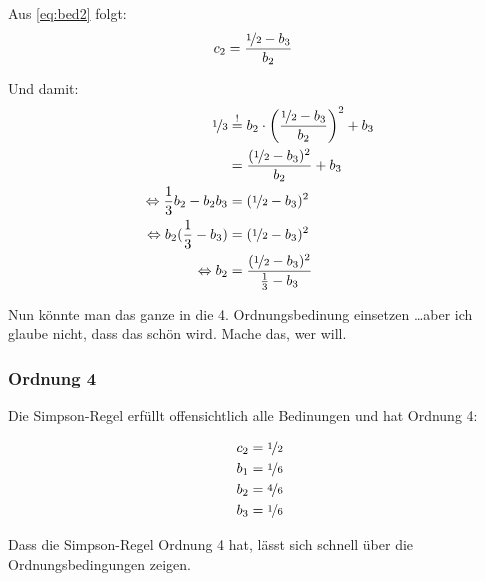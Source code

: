 Aus \ref{eq:bed2} folgt:
\begin{align}
    c_2 &= \frac{\nicefrac{1}{2} - b_3}{b_2}
\end{align}

Und damit:
\begin{align}
    \nicefrac{1}{3} &\stackrel{!}{=} b_2 \cdot \left (\frac{\nicefrac{1}{2} - b_3}{b_2} \right )^2 + b_3\\
                &= \frac{(\nicefrac{1}{2} - b_3)^2}{b_2} + b_3\\
\Leftrightarrow \frac{1}{3} b_2 - b_2 b_3&= (\nicefrac{1}{2} - b_3)^2\\
\Leftrightarrow b_2 (\frac{1}{3} - b_3) &= (\nicefrac{1}{2} - b_3)^2\\
\Leftrightarrow b_2  &= \frac{(\nicefrac{1}{2} - b_3)^2}{\frac{1}{3} - b_3}
\end{align}

Nun könnte man das ganze in die 4. Ordnungsbedinung einsetzen \dots aber ich
glaube nicht, dass das schön wird. Mache das, wer will. 

\subsubsection*{Ordnung 4}
Die Simpson-Regel erfüllt offensichtlich alle Bedinungen und hat
Ordnung 4:

\begin{align}
    c_2 &= \nicefrac{1}{2}\\
    b_1 &= \nicefrac{1}{6}\\
    b_2 &= \nicefrac{4}{6}\\
    b_3 &= \nicefrac{1}{6}
\end{align}

Dass die Simpson-Regel Ordnung 4 hat, lässt sich schnell über
die Ordnungsbedingungen zeigen. 
